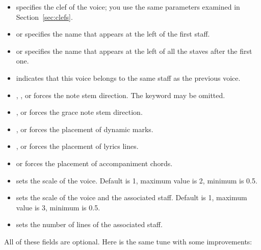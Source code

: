 \documentclass[a4paper,fullpage,12pt]{book}
\begin{document}
\begin{itemize}
  
  \item {} specifies the clef of the voice; you use the same
  parameters examined in Section~\ref{sec:clefs}.
  
  \item {} or  specifies the
  name that appears at the left of the first staff.
  
  \item {} or  specifies the
  name that appears at the left of all the staves after the first one.
  
  \item {} indicates that this voice belongs to the same staff as
  the previous voice.
  
  \item {} , , or  forces
  the note stem direction. The  keyword may be omitted.

  \item {},  or 
  forces the grace note stem direction.
  
  \item {},  or 
  forces the placement of dynamic marks.

  \item {},  or 
  forces the placement of lyrics lines.

  \item {} or  forces the placement of
  accompaniment chords.

  \item {} sets the scale of the voice. Default is
  1, maximum value is 2, minimum is 0.5.

  \item {} sets the scale of the voice and the
  associated staff. Default is 1, maximum value is 3, minimum is 0.5.
  
  \item {} sets the number of lines of the
  associated staff.
  
\end{itemize}

All of these fields are optional. Here is the same tune with some
improvements:
\end{document}
